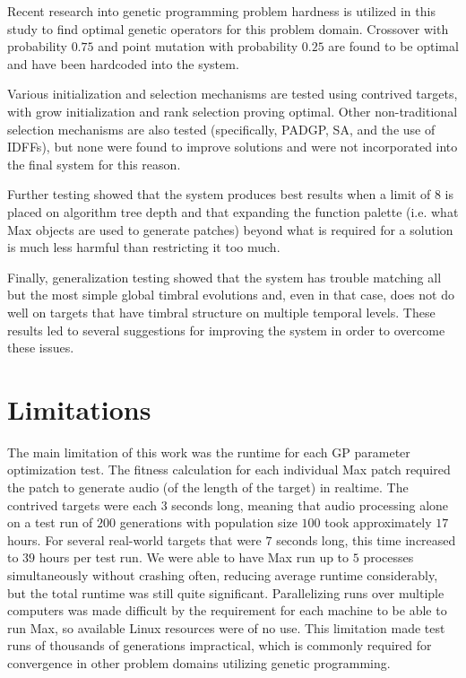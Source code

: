 \documentclass[12pt]{report} 	%
\numberwithin{figure}{chapter}
\numberwithin{table}{chapter}
\numberwithin{equation}{chapter}
\begin{document}
\begin{flushleft}
Recent research into genetic programming problem hardness is utilized in this study to find optimal genetic operators for this problem domain. Crossover with probability $0.75$ and point mutation with probability $0.25$ are found to be optimal and have been hardcoded into the system.

Various initialization and selection mechanisms are tested using contrived targets, with grow initialization and rank selection proving optimal. Other non-traditional selection mechanisms are also tested (specifically, PADGP, SA, and the use of IDFFs), but none were found to improve solutions and were not incorporated into the final system for this reason.

Further testing showed that the system produces best results when a limit of $8$ is placed on algorithm tree depth and that expanding the function palette (i.e. what Max objects are used to generate patches) beyond what is required for a solution is much less harmful than restricting it too much.

Finally, generalization testing showed that the system has trouble matching all but the most simple global timbral evolutions and, even in that case, does not do well on targets that have timbral structure on multiple temporal levels. These results led to several suggestions for improving the system in order to overcome these issues.

\vspace{12pt}\section{Limitations}
The main limitation of this work was the runtime for each GP parameter optimization test. The fitness calculation for each individual Max patch required the patch to generate audio (of the length of the target) in realtime. The contrived targets were each $3$ seconds long, meaning that audio processing alone on a test run of $200$ generations with population size $100$ took approximately $17$ hours. For several real-world targets that were $7$ seconds long, this time increased to $39$ hours per test run. We were able to have Max run up to $5$ processes simultaneously without crashing often, reducing average runtime considerably, but the total runtime was still quite significant. Parallelizing runs over multiple computers was made difficult by the requirement for each machine to be able to run Max, so available Linux resources were of no use. This limitation made test runs of thousands of generations impractical, which is commonly required for convergence in other problem domains utilizing genetic programming.


\end{flushleft}
\end{document}
